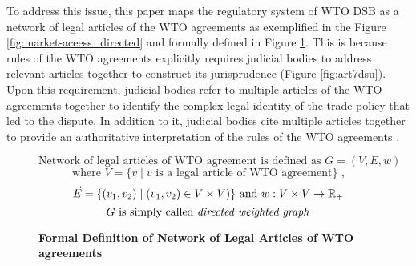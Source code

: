 To address this issue, 
this paper maps 
the regulatory system of WTO DSB 
as a network of legal articles 
of the WTO agreements as exemplified in the Figure \ref{fig:market-aceess_directed} 
and formally defined in Figure \ref{fig:def}. This is because rules of the WTO agreements
explicitly requires judicial bodies to address 
relevant articles together to construct its jurisprudence (Figure \ref{fig:art7dsu}).
Upon this requirement, judicial bodies refer to 
multiple articles of the WTO agreements together
to identify the complex legal identity of the trade policy that led to the dispute.
In addition to it, judicial bodies cite multiple articles together 
to provide an authoritative interpretation of the rules of the WTO agreements
\citep{oesch2003standards}.



\begin{figure}[ht]
\[\text{Network of legal articles of WTO agreement is defined as }  G = (V, E, w) \] 
\[\text{ where } V = \{v \mid v\text{ is a legal article of WTO agreement}\}  \text{ , } \]
\[\vec{E} = \{(v_1, v_2) \mid (v_1, v_2)\in V \times V)\} \text{ and }w : V \times V \to \Bbb R_{+} \]
\[G\text{ is simply called \textit{directed weighted graph}}\]
\caption{\textbf{Formal Definition of Network of Legal Articles of WTO agreements}}
\label{fig:def}
\end{figure}



